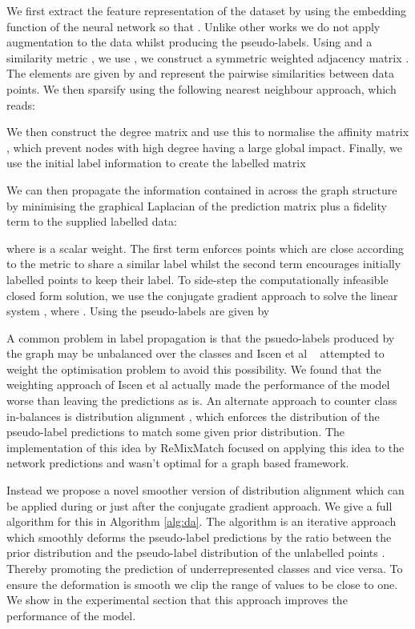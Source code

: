 \documentclass[journal]{IEEEtran}
\begin{document}
We first extract the feature representation of the dataset  by using the embedding function of the neural network  so that . Unlike other works we do not apply augmentation to the data whilst producing the pseudo-labels. Using  and a similarity metric , we use , we construct a symmetric weighted adjacency matrix . The elements  are given by  and represent the pairwise similarities between data points. We then sparsify  using the following nearest neighbour approach, which reads:



We then construct the degree matrix  and use this to normalise the affinity matrix , which prevent nodes with high degree having a large global impact. Finally, we use the initial label information to create the labelled matrix  



We can then  propagate the information contained in  across the graph structure  by minimising the graphical Laplacian of the prediction matrix  plus a fidelity term to the supplied labelled data:

{\small

}
where  is a scalar weight. The first term enforces points which are close according to the metric  to share a similar label whilst the second term encourages initially labelled points to keep their label. To side-step the computationally infeasible closed form solution, we use the conjugate gradient approach to solve the linear system , where . Using  the pseudo-labels  are given by 


A common problem in label propagation is that the psuedo-labels produced by the graph may be unbalanced over the classes and Iscen et al ~\cite{iscen2019label} attempted to weight the optimisation problem to avoid this possibility. We found that the weighting approach of Iscen et al actually made the performance of the model worse than leaving the predictions as is. An alternate approach to counter class in-balances is distribution alignment \cite{remixmatch}, which enforces the distribution of the pseudo-label predictions to match some given prior distribution.  The implementation of this idea by ReMixMatch focused on applying this idea to the network predictions and wasn't optimal for a graph based framework.

Instead we propose a novel smoother version of distribution alignment which can be applied during or just after the conjugate gradient approach. We give a full algorithm for this in Algorithm \ref{alg:da}. The algorithm is an iterative approach which smoothly deforms the pseudo-label predictions  by the ratio  between the prior distribution  and the pseudo-label distribution of the unlabelled points . Thereby promoting the prediction of underrepresented classes and vice versa. To ensure the deformation is smooth we clip the range of  values to be close to one. We show in the experimental section that this approach improves the performance of the model.  
\end{document}
